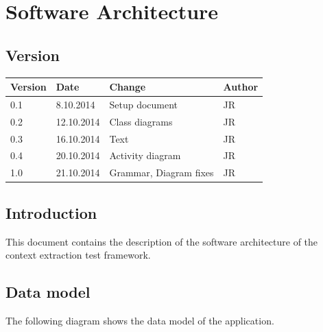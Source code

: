 
\chapter{Software Architecture} %

\label{ChapterX} %



\section{Version}

\begin{tabular}{| p{1.5cm} | p{2cm} | p{9cm} | p{1.5cm} |}
	\hline
	Version & Date 		& Change & Author \\ \hline
	0.1 	& 8.10.2014 		& Setup document  										& JR \\ \hline
	0.2 	& 12.10.2014		& Class diagrams										& JR \\ \hline
	0.3 	& 16.10.2014		& Text													& JR \\ \hline
	0.4 	& 20.10.2014		& Activity diagram										& JR \\ \hline
	1.0 	& 21.10.2014		& Grammar, Diagram fixes								& JR \\ \hline

\end{tabular}

\section{Introduction}

This document contains the description of the software architecture of the context extraction test framework. 

\pagebreak

\section{Data model}

The following diagram shows the data model of the application. 

